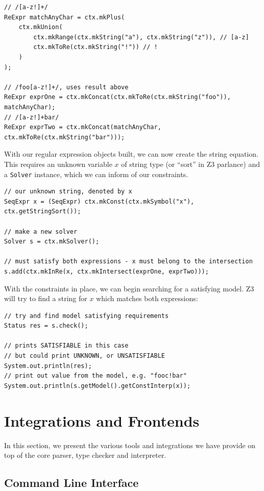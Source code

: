 \documentclass[a4paper,openany,12pt]{book}
\begin{document}
\begin{verbatim}
// /[a-z!]+/
ReExpr matchAnyChar = ctx.mkPlus(
    ctx.mkUnion(
        ctx.mkRange(ctx.mkString("a"), ctx.mkString("z")), // [a-z]
        ctx.mkToRe(ctx.mkString("!")) // !
    )
);

// /foo[a-z!]+/, uses result above
ReExpr exprOne = ctx.mkConcat(ctx.mkToRe(ctx.mkString("foo")), matchAnyChar);
// /[a-z!]+bar/
ReExpr exprTwo = ctx.mkConcat(matchAnyChar, ctx.mkToRe(ctx.mkString("bar")));
\end{verbatim}

With our regular expression objects built, we can now create the string equation.
This requires an unknown variable $x$ of string type (or ``sort'' in Z3 parlance) and a \texttt{Solver} instance,
which we can inform of our constraints.

\begin{verbatim}
// our unknown string, denoted by x
SeqExpr x = (SeqExpr) ctx.mkConst(ctx.mkSymbol("x"), ctx.getStringSort());

// make a new solver
Solver s = ctx.mkSolver();

// must satisfy both expressions - x must belong to the intersection
s.add(ctx.mkInRe(x, ctx.mkIntersect(exprOne, exprTwo)));
\end{verbatim}

With the constraints in place, we can begin searching for a satisfying model.
Z3 will try to find a string for $x$ which matches both expressions:

\begin{verbatim}
// try and find model satisfying requirements
Status res = s.check();

// prints SATISFIABLE in this case
// but could print UNKNOWN, or UNSATISFIABLE
System.out.println(res);
// print out value from the model, e.g. "fooc!bar"
System.out.println(s.getModel().getConstInterp(x));
\end{verbatim}

\section{Integrations and Frontends}

In this section, we present the various tools and integrations we have provide on top of the core parser, type checker
and interpreter.

\subsection{Command Line Interface}
\end{document}
